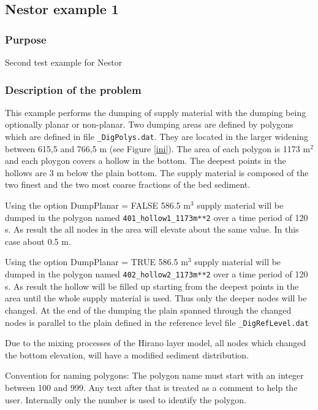 \subsection{Nestor example 1}
%

%
\subsubsection{Purpose}
%
Second test example for Nestor
%
\subsubsection{Description of the problem}
%
This example performs the dumping of supply material with the dumping being optionally planar or non-planar.
Two dumping areas are defined by polygons which are defined in file \texttt{\_DigPolys.dat}. They are located in the larger widening between 615,5 and 766,5 m (see Figure \ref{ini}).
The area of each polygon is 1173 m$^2$ and each ploygon covers a hollow in the bottom. The deepest points in the hollows are 3 m below the plain bottom.
The supply material is composed of the two finest and the two most coarse fractions of the bed sediment. 


Using the option DumpPlanar = FALSE 586.5 m$^3$ supply material will be dumped in the polygon named \texttt{401\_hollow1\_1173m**2} over a time period of 120 s. As result the all nodes in the area will elevate about the same value. In this case about 0.5 m. 

Using the option DumpPlanar = TRUE 586.5 m$^3$ supply material will be dumped in the polygon named \texttt{402\_hollow2\_1173m**2} over a time period of 120 s. As result the hollow will be filled up starting from the deepest points in the area until the whole supply material is used. Thus only the deeper nodes will be changed. 
At the end of the dumping the plain spanned through the changed nodes is parallel to the plain  defined in the reference level file \texttt{\_DigRefLevel.dat}   

Due to the mixing processes of the Hirano layer model, all nodes which changed the bottom elevation, will have a modified sediment distribution.  


Convention for naming polygons: The polygon name must start with an integer between 100 and 999. Any text after that is treated as a comment to  help the user. 
Internally only the number is used to identify the polygon. 


